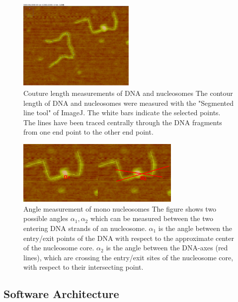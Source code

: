 \documentclass{article}
\begin{document}
\begin{figure}[h!]
\centering
\includegraphics[width = 0.5\textwidth]{coutureLength.png}
\caption{Couture length measurements of DNA and nucleosomes
The contour length of DNA and nucleosomes were measured with the "Segmented line tool" of ImageJ. The white bars indicate the selected points. The lines have been traced centrally through the DNA fragments from one end point to the other end point.}
\label{fig: couture length}
\end{figure}

\begin{figure}[h!]
\centering
\includegraphics[width=0.7\textwidth]{angleMeasurement.png}
\caption{Angle measurement of mono nucleosomes
The figure shows two possible angles $\alpha_1, \alpha_2$ which can be measured between the two entering DNA strands of an nucleosome. $\alpha_1$ is the angle between the entry/exit points of the DNA with respect to the approximate center of the nucleosome core. $\alpha_2$ is the angle between the DNA-axes (red lines), which are crossing the entry/exit sites of the nucleosome core, with respect to their intersecting point.}
\label{fig: angle measurement}
\end{figure}
\newpage
\subsection{Software Architecture}\label{sec:Software Architecture}
\end{document}
